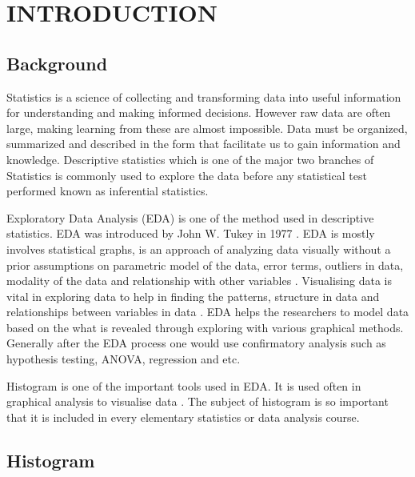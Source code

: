 \chapter{\textbf{INTRODUCTION}}\label{Introchap} 

\section{Background}

Statistics is a science of collecting and transforming data into useful information for understanding and making informed decisions. However raw data are often large, making learning from these are almost impossible. Data must be organized, summarized and described in the form that facilitate us to gain information and knowledge. Descriptive statistics which is one of the major two branches of Statistics is commonly used to explore the data before any statistical test performed known as inferential statistics. 

Exploratory Data Analysis (EDA) is one of the method used in descriptive statistics. EDA was introduced by John W. Tukey in 1977 \cite[]{wendy2002computational}. EDA is mostly involves statistical graphs, is an approach of analyzing data visually without a prior assumptions on parametric model of the data, error terms, outliers in data, modality of the data and relationship with other variables \cite[]{velleman1981applications,wendy2002computational}. Visualising data is vital in exploring data \cite[]{scott2005multidimensional} to help in finding the  patterns, structure in data and relationships between variables in data \cite[]{hand2001principles}. EDA helps the researchers to model data based on the what is revealed through exploring with various graphical methods. Generally after the EDA process one would use confirmatory analysis such as hypothesis testing, ANOVA, regression and etc.

Histogram is one of the important tools used in EDA. It is used often in graphical analysis to visualise data \cite[]{li2016essential}. The subject of histogram is so important that it is included in every elementary statistics or data analysis course. 

\section{Histogram}

